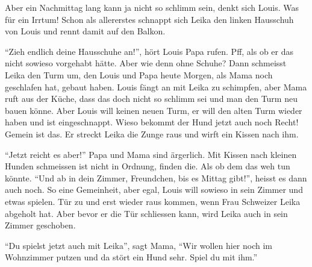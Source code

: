 Aber ein Nachmittag lang kann ja nicht so schlimm sein, denkt sich Louis. Was für ein Irrtum! Schon als allererstes schnappt sich Leika den linken Hausschuh von Louis und rennt damit auf den Balkon.

\enquote{Zieh endlich deine Hausschuhe an!}, hört Louis Papa rufen. Pff, als ob
er das nicht sowieso vorgehabt hätte. Aber wie denn ohne Schuhe? Dann schmeisst
Leika den Turm um, den Louis und Papa heute Morgen, als Mama noch geschlafen
hat, gebaut haben. Louis fängt an mit Leika zu schimpfen, aber Mama ruft aus
der Küche, dass das doch nicht so schlimm sei und man den Turm neu bauen könne.
Aber Louis will keinen neuen Turm, er will den alten Turm wieder haben und ist
eingeschnappt. Wieso bekommt der Hund jetzt auch noch Recht! Gemein ist das. Er
streckt Leika die Zunge raus und wirft ein Kissen nach ihm.

\enquote{Jetzt reicht es aber!} Papa und Mama sind ärgerlich. Mit Kissen nach
kleinen Hunden schmeissen ist nicht in Ordnung, finden die. Als ob dem das weh tun könnte.
\enquote{Und ab in dein Zimmer, Freundchen, bis es Mittag gibt!}, heisst es dann auch noch. So eine Gemeinheit, aber egal, Louis will sowieso in sein Zimmer und etwas spielen. Tür zu und erst wieder raus kommen, wenn Frau Schweizer Leika abgeholt hat. Aber bevor er die Tür schliessen kann, wird Leika auch in sein Zimmer geschoben. 

\enquote{Du spielst jetzt auch mit Leika}, sagt Mama, \enquote{Wir wollen hier noch im Wohnzimmer putzen und da stört ein Hund sehr. Spiel du mit ihm.}

